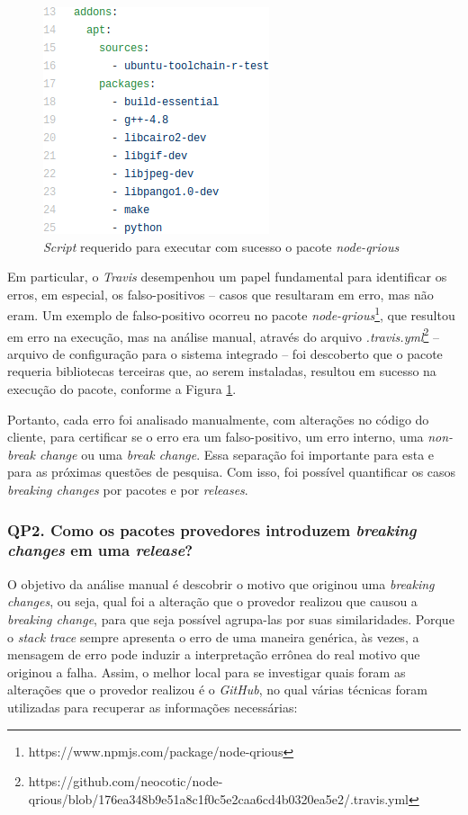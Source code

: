 \begin{itemize}
    \begin{figure}
        \centering
        \includegraphics[scale=0.6]{figuras/false_positive.png}
        \caption{\textit{Script} requerido para executar com sucesso o pacote \textit{node-qrious}}
        \label{fig:false-positive}
    \end{figure}{}

    Em particular, o \textit{Travis} desempenhou um papel fundamental para identificar os erros, em especial, os falso-positivos -- casos que resultaram em erro, mas não eram. Um exemplo de falso-positivo ocorreu no pacote \textit{node-qrious}\footnote{https://www.npmjs.com/package/node-qrious}, que resultou em erro na execução, mas na análise manual, através do arquivo \textit{.travis.yml}\footnote{https://github.com/neocotic/node-qrious/blob/176ea348b9e51a8c1f0c5e2caa6cd4b0320ea5e2/.travis.yml} -- arquivo de configuração para o sistema integrado -- foi descoberto que o pacote requeria bibliotecas terceiras que, ao serem instaladas, resultou em sucesso na execução do pacote, conforme a Figura \ref{fig:false-positive}.
\end{itemize}{}

Portanto, cada erro foi analisado manualmente, com alterações no código do cliente, para certificar se o erro era um falso-positivo, um erro interno, uma \textit{non-break change} ou uma \textit{break change}. Essa separação foi importante para esta e para as próximas questões de pesquisa. Com isso, foi possível quantificar os casos \textit{breaking changes} por pacotes e por \textit{releases}.

\subsubsection{QP2. Como os pacotes provedores introduzem \textit{breaking changes} em uma \textit{release}?}
\label{apr:rq2}
O objetivo da análise manual é descobrir o motivo que originou uma \textit{breaking changes}, ou seja, qual foi a alteração que o provedor realizou que causou a \textit{breaking change}, para que seja possível agrupa-las por suas similaridades. Porque o \textit{stack trace} sempre apresenta o erro de uma maneira genérica, às vezes, a mensagem de erro pode induzir a interpretação errônea do real motivo que originou a falha. Assim, o melhor local para se investigar quais foram as alterações que o provedor realizou é o \textit{GitHub}, no qual várias técnicas foram utilizadas para recuperar as informações necessárias:

